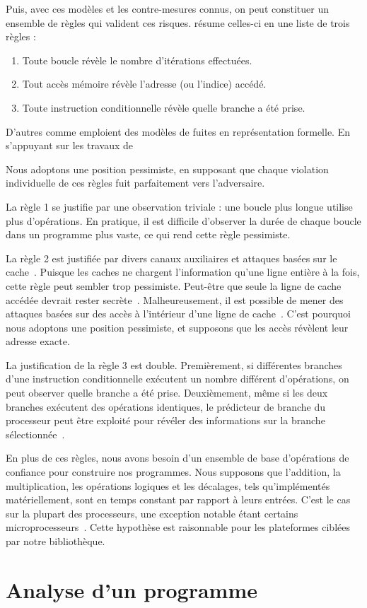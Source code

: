 Puis, avec ces modèles et les contre-mesures connus, on peut constituer un ensemble de règles qui valident ces risques. \cite{CTsaferCrypto} résume celles-ci en une liste de trois règles :
\begin{enumerate}
  \item Toute boucle révèle le nombre d'itérations effectuées. 
  \item Tout accès mémoire révèle l'adresse (ou l'indice) accédé.
  \item Toute instruction conditionnelle révèle quelle branche a été prise.
\end{enumerate}

D'autres comme \cite{binsecRel2019} emploient des modèles de fuites en représentation formelle. En s'appuyant sur les travaux de \citeauthor{formalConstantTime} \cite{formalConstantTime}

Nous adoptons une position pessimiste, en supposant que chaque violation individuelle de ces règles fuit parfaitement vers l'adversaire.

La règle 1 se justifie par une observation triviale : une boucle plus longue utilise plus d'opérations. En pratique, il est difficile d'observer la durée de chaque boucle dans un programme plus vaste, ce qui rend cette règle pessimiste.

La règle 2 est justifiée par divers canaux auxiliaires et attaques basées sur le cache~\cite{Ber05, YGH17, CAPGATB19}. Puisque les caches ne chargent l'information qu'une ligne entière à la fois, cette règle peut sembler trop pessimiste. Peut-être que seule la ligne de cache accédée devrait rester secrète~\cite{Bri11}. Malheureusement, il est possible de mener des attaques basées sur des accès à l'intérieur d'une ligne de cache~\cite{BS13, OST06, YGH17}. C'est pourquoi nous adoptons une position pessimiste, et supposons que les accès révèlent leur adresse exacte.

La justification de la règle 3 est double. Premièrement, si différentes branches d'une instruction conditionnelle exécutent un nombre différent d'opérations, on peut observer quelle branche a été prise. Deuxièmement, même si les deux branches exécutent des opérations identiques, le prédicteur de branche du processeur peut être exploité pour révéler des informations sur la branche sélectionnée~\cite{AKS06, AKS07, EPAG16}.

En plus de ces règles, nous avons besoin d'un ensemble de base d'opérations de confiance pour construire nos programmes. Nous supposons que l'addition, la multiplication, les opérations logiques et les décalages, tels qu'implémentés matériellement, sont en temps constant par rapport à leurs entrées. C'est le cas sur la plupart des processeurs, une exception notable étant certains microprocesseurs~\cite{Por}. Cette hypothèse est raisonnable pour les plateformes ciblées par notre bibliothèque.

\cite{binsecRel2019}


\section{Analyse d'un programme}



